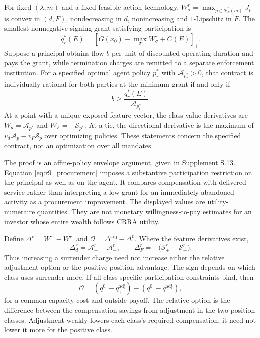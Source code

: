 \begin{proposition}
\label{prop:r9_participation}
For fixed $(\lambda,m)$ and a fixed feasible action technology, $W^r_\sigma=\max_{p\in\mathcal P^r_\sigma(m)}J_p$ is convex in $(d,F)$, nondecreasing in $d$, nonincreasing and $1$-Lipschitz in $F$. The smallest nonnegative signing grant satisfying participation is
\begin{equation}
 q_r^*(E)=\left[G(x_0)-\max_{\sigma}W^r_\sigma+C(E)\right]_+.
 \label{eq:r9_participation}
\end{equation}
Suppose a principal obtains flow $b$ per unit of discounted operating duration and pays the grant, while termination charges are remitted to a separate enforcement institution. For a specified optimal agent policy $p_r^*$ with $\mathcal A_{p_r^*}>0$, that contract is individually rational for both parties at the minimum grant if and only if
\begin{equation}
 b\geq \frac{q_r^*(E)}{\mathcal A_{p_r^*}}.
 \label{eq:r9_procurement}
\end{equation}
At a point with a unique exposed feature vector, the class-value derivatives are $W_d=\mathcal A_{p^*}$ and $W_F=-\mathcal S_{p^*}$. At a tie, the directional derivative is the maximum of $v_d\mathcal A_p-v_F\mathcal S_p$ over optimizing policies. These statements concern the specified contract, not an optimization over all mandates.
\end{proposition}

The proof is an affine-policy envelope argument, given in Supplement S.13. Equation \eqref{eq:r9_procurement} imposes a substantive participation restriction on the principal as well as on the agent. It compares compensation with delivered service rather than interpreting a low grant for an immediately abandoned activity as a procurement improvement. The displayed values are utility-numeraire quantities. They are not monetary willingness-to-pay estimates for an investor whose entire wealth follows CRRA utility.

Define $\Delta^r=W^r_+-W^r_-$ and $\mathcal O=\Delta^{\mathrm{adj}}-\Delta^0$. Where the feature derivatives exist,
\begin{equation}
 \Delta^r_d=\mathcal A^r_+-\mathcal A^r_-,\qquad
 \Delta^r_F=-\bigl(\mathcal S^r_+-\mathcal S^r_-\bigr).
 \label{eq:r9_delta_derivatives}
\end{equation}
Thus increasing a surrender charge need not increase either the relative adjustment option or the positive-position advantage. The sign depends on which class uses surrender more. If all class-specific participation constraints bind, then
\begin{equation}
 \mathcal O=(q^0_+-q^{\mathrm{adj}}_+)-(q^0_--q^{\mathrm{adj}}_-),
 \label{eq:r9_option_price}
\end{equation}
for a common capacity cost and outside payoff. The relative option is the difference between the compensation savings from adjustment in the two position classes. Adjustment weakly lowers each class's required compensation; it need not lower it more for the positive class.

